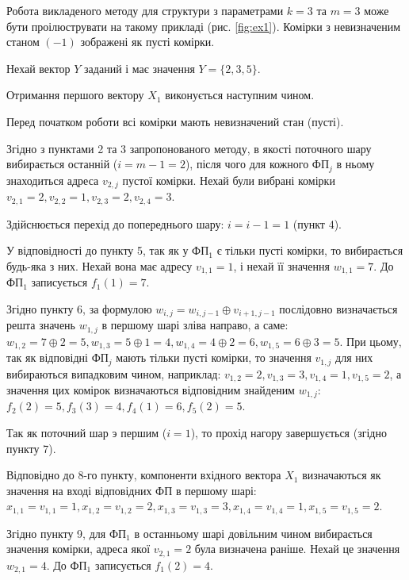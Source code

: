 \documentclass[12pt]{article}
\begin{document}

Робота викладеного методу для структури з параметрами $k=3$ та $m=3$ може бути проілюструвати на такому прикладі (рис. \ref{fig:ex1}).
Комірки з невизначеним станом $(-1)$ зображені як пусті комірки.

Нехай вектор $Y$ заданий і має значення $Y = \{ 2, 3, 5 \}$.

Отримання першого вектору $X_1$ виконується наступним чином.

Перед початком роботи всі комірки мають невизначений стан (пусті).

Згідно з пунктами 2 та 3 запропонованого методу, в якості поточного шару вибирається останній ($i = m - 1 = 2$), після чого для кожного ФП$_j$ в ньому знаходиться адреса $v_{2, j}$ пустої комірки. Нехай були вибрані комірки $v_{2,1}=2, v_{2,2}=1, v_{2,3}=2, v_{2,4}=3$.

Здійснюється перехід до попереднього шару: $i = i - 1 = 1$ (пункт 4).

У відповідності до пункту 5, так як у ФП$_1$ є тільки пусті комірки, то вибирається будь-яка з них.
Нехай вона має адресу $v_{1,1}=1$, і нехай її значення $w_{1,1}=7$.
До ФП$_1$ записується $f_1(1)=7$.

Згідно пункту 6, за формулою $w_{i,j} = w_{i,j-1} \oplus v_{i+1,j-1}$ послідовно визначається решта значень $w_{1,j}$ в першому шарі зліва направо, а саме: $w_{1,2} = 7 \oplus 2 = 5, w_{1,3} = 5 \oplus 1 = 4, w_{1,4} = 4 \oplus 2 = 6, w_{1,5} = 6 \oplus 3 = 5$.
При цьому, так як відповідні ФП$_j$ мають тільки пусті комірки, то значення $v_{1,j}$ для них вибираються випадковим чином, наприклад: $v_{1,2} = 2, v_{1,3} = 3, v_{1,4} = 1, v_{1,5} = 2$, а значення цих комірок визначаються відповідним знайденим $w_{1,j}$: $f_2(2)=5, f_3(3)=4, f_4(1)=6, f_5(2)=5$.

Так як поточний шар э першим ($i=1$), то прохід нагору завершується (згідно пункту 7).

Відповідно до 8-го пункту, компоненти вхідного вектора $X_1$ визначаються як значення на вході відповідних ФП в першому шарі: $x_{1,1}=v_{1,1}=1, x_{1,2}=v_{1,2}=2, x_{1,3}=v_{1,3}=3, x_{1,4}=v_{1,4}=1, x_{1,5}=v_{1,5}=2$.

Згідно пункту 9, для ФП$_1$ в останньому шарі довільним чином вибирається значення комірки, адреса якої $v_{2,1}=2$ була визначена раніше. Нехай це значення $w_{2,1}=4$. До ФП$_1$ записується $f_1(2)=4$.
\end{document}
